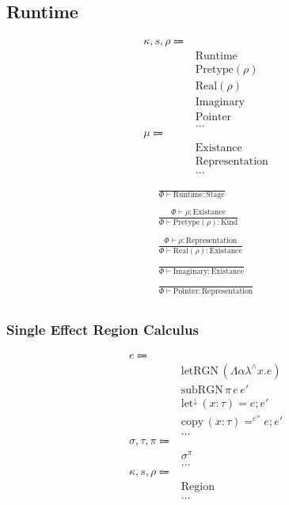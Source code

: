 \documentclass {article}
\begin{document}
\subsection{Runtime}

\begin{align*}
\kappa, s, \rho \Coloneqq & \\
& \text{Runtime} \tag{Runtime Stage}\\
& \text{Pretype}(\rho) \tag{Pretype Kind}\\
& \text{Real} (\rho) \tag{Real Existance} \\
& \text{Imaginary} \tag{Imaginary Existance} \\
& \text{Pointer} \tag{Pointer Representation}\\
& \dots \\
\mu \Coloneqq & \\
& \text{Existance} \\
& \text{Representation} \\
& \dots
\end{align*}

\begin{gather*}
\frac
{}
{\Phi \vdash \text{Runtime} : \text{Stage}} \\
\\
\frac
{\Phi \vdash \rho : \text{Existance}}
{\Phi \vdash \text{Pretype} (\rho) : \text{Kind}} \\
\\
\frac
{\Phi \vdash \rho : \text{Representation}}
{\Phi \vdash \text{Real} (\rho) : \text{Existance}} \\
\\
\frac
{}
{\Phi \vdash \text{Imaginary} : \text{Existance}} \\
\\
\frac
{}
{\Phi \vdash \text{Pointer} : \text{Representation}} \\
\end{gather*}

\subsubsection{Single Effect Region Calculus}
\begin{align*}
e \Coloneqq & \\
& \text{letRGN} \, (\Lambda \alpha \lambda^\wedge x. e) \tag{Create Region} \\
& \text{subRGN} \, \pi \, e \, e' \tag{Subtype Region} \\
& \text{let}^\downarrow \, (x : \tau) = e; e' \tag{Runtime Let} \\
& \text{copy} \, (x : \tau) =^{e''} e; e' \tag{Runtime Copy Let} \\
& \dots \\
\sigma, \tau, \pi \Coloneqq & \\
& \sigma^\pi \tag{Region Effect} \\
& \dots \\
\kappa, s, \rho \Coloneqq & \\
& \text{Region} \tag{Region} \\
& \dots
\end{align*}
\end{document}
